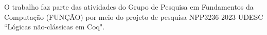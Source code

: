 O trabalho faz parte das atividades do Grupo de Pesquisa em Fundamentos da Computação (FUNÇÃO) por meio do projeto de pesquisa NPP3236-2023 UDESC ``Lógicas não-clássicas em Coq".